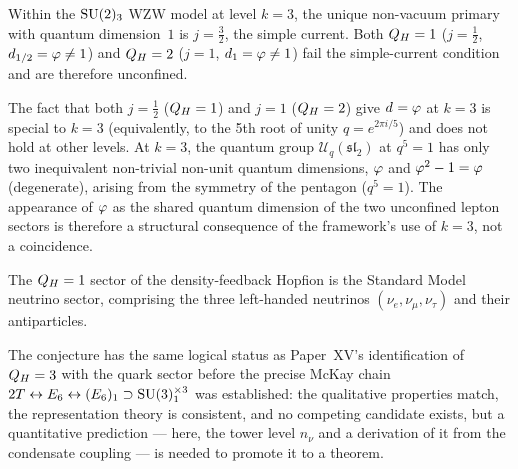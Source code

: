 \begin{proposition}[$\dimq{}=1$ is the confinement criterion]
\label{P17:prop:dimq_confinement}
Within the $\mathrm{SU}(2)_3$ WZW model at level $k=3$, the unique non-vacuum
primary with quantum dimension~$1$ is $j=\tfrac32$, the simple
current. Both $\QH=1$ ($j=\tfrac12$, $d_{1/2}=\varphi\neq1$) and
$Q_H=2$ ($j=1$, $d_{1}=\varphi\neq1$) fail the simple-current
condition and are therefore unconfined.
\end{proposition}

\begin{remark}[Shared quantum dimension is a $k=3$ structural fact]
\label{P17:rem:phi_unconfined}
The fact that both $j=\tfrac12$ ($\QH=1$) and $j=1$ ($Q_H=2$) give
$d_{}=\varphi$ at $k=3$ is special to $k=3$ (equivalently, to the
5th root of unity $q=e^{2\pi i/5}$) and does not hold at other levels.
At $k=3$, the quantum group $\mathcal{U}_q(\mathfrak{sl}_2)$ at
$q^5=1$ has only two inequivalent non-trivial non-unit quantum
dimensions, $\varphi$ and $\varphi^2-1=\varphi$ (degenerate), arising from the
symmetry of the pentagon ($q^5=1$). The appearance of $\varphi$ as the
shared quantum dimension of the two unconfined lepton sectors is
therefore a structural consequence of the framework's use of $k=3$,
not a coincidence.
\end{remark}

\begin{conjecture}[Physical identification of $\QH=1$]
\label{P17:conj:nu_identification}
The $\QH=1$ sector of the density-feedback Hopfion is the Standard
Model neutrino sector, comprising the three left-handed neutrinos
$(\nu_e,\nu_\mu,\nu_\tau)$ and their antiparticles.
\end{conjecture}

\begin{remark}
\label{P17:rem:conj_status}
The conjecture has the same logical status as Paper~XV's identification
of $Q_H=3$ with the quark sector before the precise McKay chain
$2T\leftrightarrow E_6\leftrightarrow(E_6)_1\supset\mathrm{SU}(3)_1^{\times3}$
was established: the qualitative properties match, the representation
theory is consistent, and no competing candidate exists, but a
quantitative prediction --- here, the tower level $n_\nu$ and a
derivation of it from the condensate coupling --- is needed to
promote it to a theorem.
\end{remark}

